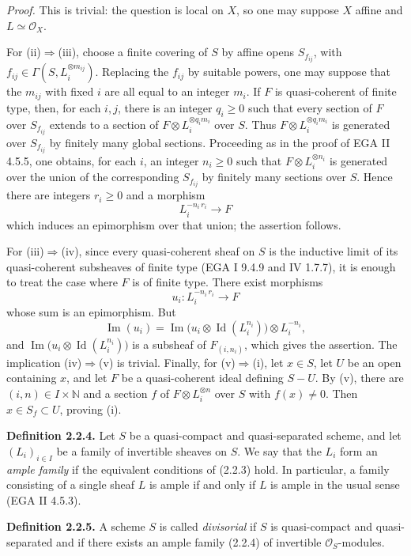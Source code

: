 \documentclass[11pt]{article}
\begin{document}
\emph{Proof.} This is trivial: the question is local on $X$, so one may suppose $X$ affine and $L\simeq\mathcal O_X$.

For (ii)$\Rightarrow$(iii), choose a finite covering of $S$ by affine opens $S_{f_{ij}}$, with $f_{ij}\in\Gamma(S,L_i^{\otimes m_{ij}})$. Replacing the $f_{ij}$ by suitable powers, one may suppose that the $m_{ij}$ with fixed $i$ are all equal to an integer $m_i$. If $F$ is quasi-coherent of finite type, then, for each $i,j$, there is an integer $q_i\ge0$ such that every section of $F$ over $S_{f_{ij}}$ extends to a section of $F\otimes L_i^{\otimes q_im_i}$ over $S$. Thus $F\otimes L_i^{\otimes q_im_i}$ is generated over $S_{f_{ij}}$ by finitely many global sections. Proceeding as in the proof of EGA II 4.5.5, one obtains, for each $i$, an integer $n_i\ge0$ such that $F\otimes L_i^{\otimes n_i}$ is generated over the union of the corresponding $S_{f_{ij}}$ by finitely many sections over $S$. Hence there are integers $r_i\ge0$ and a morphism
\[
L_i^{-n_i\, r_i}\longrightarrow F
\]
which induces an epimorphism over that union; the assertion follows.

For (iii)$\Rightarrow$(iv), since every quasi-coherent sheaf on $S$ is the inductive limit of its quasi-coherent subsheaves of finite type (EGA I 9.4.9 and IV 1.7.7), it is enough to treat the case where $F$ is of finite type. There exist morphisms
\[
u_i:L_i^{-n_i\, r_i}\longrightarrow F
\]
whose sum is an epimorphism. But
\[
\operatorname{Im}(u_i)=\operatorname{Im}\bigl(u_i\otimes\operatorname{Id}(L_i^{n_i})\bigr)\otimes L_i^{-n_i},
\]
and $\operatorname{Im}\bigl(u_i\otimes\operatorname{Id}(L_i^{n_i})\bigr)$ is a subsheaf of $F_{(i,n_i)}$, which gives the assertion. The implication (iv)$\Rightarrow$(v) is trivial. Finally, for (v)$\Rightarrow$(i), let $x\in S$, let $U$ be an open containing $x$, and let $F$ be a quasi-coherent ideal defining $S-U$. By (v), there are $(i,n)\in I\times\mathbb N$ and a section $f$ of $F\otimes L_i^{\otimes n}$ over $S$ with $f(x)\ne0$. Then $x\in S_f\subset U$, proving (i).

\textbf{Definition 2.2.4.} Let $S$ be a quasi-compact and quasi-separated scheme, and let $(L_i)_{i\in I}$ be a family of invertible sheaves on $S$. We say that the $L_i$ form an \emph{ample family} if the equivalent conditions of (2.2.3) hold. In particular, a family consisting of a single sheaf $L$ is ample if and only if $L$ is ample in the usual sense (EGA II 4.5.3).

\textbf{Definition 2.2.5.} A scheme $S$ is called \emph{divisorial} if $S$ is quasi-compact and quasi-separated and if there exists an ample family (2.2.4) of invertible $\mathcal O_S$-modules.
\end{document}

